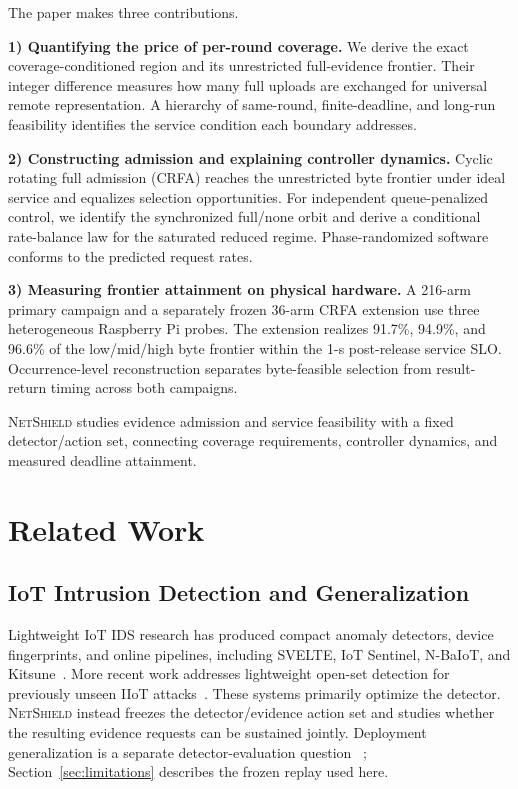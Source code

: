 \documentclass[10pt,journal]{IEEEtran}
\newcommand{\NetShield}{\textsc{NetShield}}
\newcommand{\CRFA}{\textsc{CRFA}}
\begin{document}
The paper makes three contributions.

\textbf{1) Quantifying the price of per-round coverage.}
We derive the exact coverage-conditioned region and its unrestricted
full-evidence frontier. Their integer difference measures how many full
uploads are exchanged for universal remote representation. A hierarchy of
same-round, finite-deadline, and long-run feasibility identifies the service
condition each boundary addresses.

\textbf{2) Constructing admission and explaining controller dynamics.}
Cyclic rotating full admission (\CRFA{}) reaches the unrestricted byte
frontier under ideal service and equalizes selection opportunities. For
independent queue-penalized control, we identify the synchronized full/none
orbit and derive a conditional rate-balance law for the saturated reduced
regime. Phase-randomized software conforms to the predicted request rates.

\textbf{3) Measuring frontier attainment on physical hardware.}
A 216-arm primary campaign and a separately frozen 36-arm \CRFA{} extension
use three heterogeneous Raspberry Pi probes. The extension realizes 91.7\%,
94.9\%, and 96.6\% of the low/mid/high byte frontier within the 1-s
post-release service SLO. Occurrence-level reconstruction separates
byte-feasible selection from result-return timing across both campaigns.

\NetShield{} studies evidence admission and service feasibility with a fixed
detector/action set, connecting coverage requirements, controller dynamics,
and measured deadline attainment.

\section{Related Work}
\label{sec:related}

\subsection{IoT Intrusion Detection and Generalization}
Lightweight IoT IDS research has produced compact anomaly detectors, device
fingerprints, and online pipelines, including SVELTE, IoT Sentinel, N-BaIoT,
and Kitsune~\cite{raza2013svelte,miettinen2017iotsentinel,
meidan2018nbaiot,mirsky2018kitsune}. More recent work addresses lightweight
open-set detection for previously unseen IIoT attacks~\cite{yang2025openset}.
These systems primarily optimize the detector. \NetShield{} instead freezes
the detector/evidence action set and studies whether the resulting evidence
requests can be sustained jointly. Deployment generalization is a separate detector-evaluation question
~\cite{sommer2010closedworld}; Section~\ref{sec:limitations} describes the
frozen replay used here.
\end{document}
